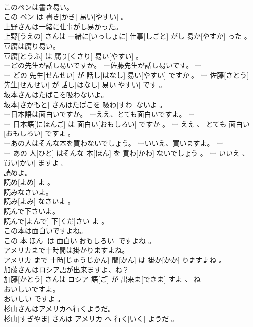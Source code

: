 \documentclass[8pt]{extreport}
\begin{document}
\begin{CJK}{UTF8}{min}
\\	このペンは書き易い。	
\\	この ペン は 書き[かき] 易い[やすい] 。
\\	上野さんは一緒に仕事がし易かった。	
\\	上野[うえの] さんは 一緒に[いっしょに] 仕事[しごと] がし 易か[やすか] った 。
\\	豆腐は腐り易い。	
\\	豆腐[とうふ] は 腐り[くさり] 易い[やすい] 。
\\	ーどの先生が話し易いですか。 ー佐藤先生が話し易いです。	ー
\\	ー どの 先生[せんせい] が 話し[はなし] 易い[やすい] ですか 。 ー 佐藤[さとう] 先生[せんせい] が 話し[はなし] 易い[やすい] です 。
\\	坂本さんはたばこを吸わないよ。	
\\	坂本[さかもと] さんはたばこを 吸わ[すわ] ないよ 。
\\	ー日本語は面白いですか。 ーええ、とても面白いですよ。	ー
\\	ー 日本語[にほんご] は 面白い[おもしろい] ですか 。 ー ええ 、 とても 面白い[おもしろい] ですよ 。
\\	ーあの人はそんな本を買わないでしょう。 ーいいえ、買いますよ。	ー
\\	ー あの 人[ひと] はそんな 本[ほん] を 買わ[かわ] ないでしょう 。 ー いいえ 、 買い[かい] ますよ 。
\\	読めよ。	
\\	読め[よめ] よ 。
\\	読みなさいよ。	
\\	読み[よみ] なさいよ 。
\\	読んで下さいよ。	
\\	読んで[よんで] 下[くだ]さい よ 。
\\	この本は面白いですよね。	
\\	この 本[ほん] は 面白い[おもしろい] ですよね 。
\\	アメリカまで十時間は掛かりますよね。	
\\	アメリカ まで 十時[じゅうじかん] 間[かん] は 掛か[かか] りますよね 。
\\	加藤さんはロシア語が出来ますよ、ね？	
\\	加藤[かとう] さんは ロシア 語[ご] が 出来ま[できま] すよ 、 ね 
\\	おいしいですよ。	
\\	おいしい ですよ 。
\\	杉山さんはアメリカへ行くようだ。	
\\	杉山[すぎやま] さんは アメリカ へ 行く[いく] ようだ 。

\end{CJK}
\end{document}
